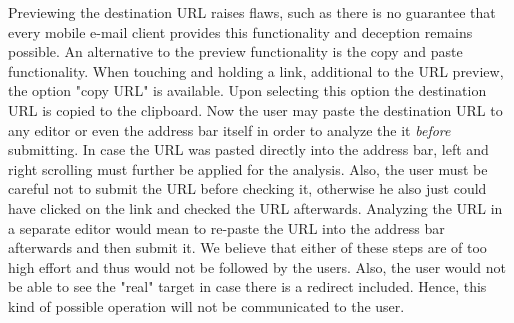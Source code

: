 \begin{description}[leftmargin=0cm]
	\item[Copy and Paste URL] Previewing the destination URL raises flaws, such as there is no guarantee that every mobile e-mail client provides this functionality and deception remains possible. 
An alternative to the preview functionality is the copy and paste functionality.
When touching and holding a link, additional to the URL preview, the option "copy URL" is available.
Upon selecting this option the destination URL is copied to the clipboard.
Now the user may paste the destination URL to any editor or even the address bar itself in order to analyze the it \textit{before} submitting.
In case the URL was pasted directly into the address bar, left and right scrolling must further be applied for the analysis. 
Also, the user must be careful not to submit the URL before checking it, otherwise he also just could have clicked on the link and checked the URL afterwards.
Analyzing the URL in a separate editor would mean to re-paste the URL into the address bar afterwards and then submit it.
We believe that either of these steps are of too high effort and thus would not be followed by the users.
Also, the user would not be able to see the "real" target in case there is a redirect included. 
Hence, this kind of possible operation will not be communicated to the user.
\end{description}

